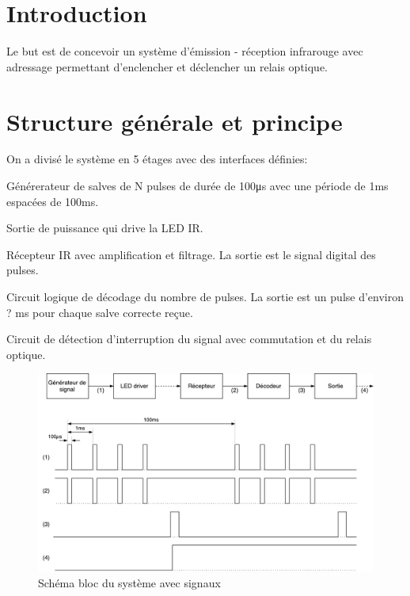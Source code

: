 \documentclass[french]{layout/Report}
\begin{document}


\section{Introduction}
Le but est de concevoir un système d'émission - réception infrarouge avec adressage
permettant d'enclencher et déclencher un relais optique.

\section{Structure générale et principe}

On a divisé le système en 5 étages avec des interfaces définies:

\begin{description}[leftmargin=!,labelwidth=4cm, labelindent=\parindent]
\item[Générateur de signal] Générerateur de salves de N pulses de durée de 100\si{\micro\second} avec une période de 1\si{\milli\second} espacées de 100\si{\milli\second}.
\item[LED driver] Sortie de puissance qui drive la LED IR.
\item[Récepteur] Récepteur IR avec amplification et filtrage. La sortie est le signal digital des pulses.
\item[Décodeur] Circuit logique de décodage du nombre de pulses. La sortie est un pulse d'environ ? \si{\milli\second} pour chaque salve correcte reçue.
\item[Sortie] Circuit de détection d'interruption du signal avec commutation et  du relais optique.
\end{description}

\begin{figure}[h]
\centering
\vspace{5mm}
\includegraphics[width=\textwidth]{fig/IRemote_schema_structure}
\caption{Schéma bloc du système avec signaux}
\label{fig:schema_bloc}
\vspace{5mm}
\end{figure}
\end{document}
